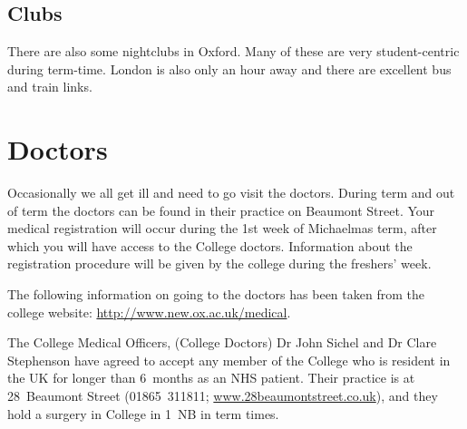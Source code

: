 \subsection{Clubs}
There are also some nightclubs in Oxford. Many of these are very student-centric during term-time. London is also only an hour away and there are excellent bus and train links.
\section{Doctors}
Occasionally we all get ill and need to go visit the doctors. During term and out of term the doctors can be found in their practice on Beaumont Street. Your medical registration will occur during the 1st week of Michaelmas term, after which you will have access to the College doctors. Information about the registration procedure will be given by the college during the freshers’ week. 

The following information on going to the doctors has been taken from the
college website: \mbox{\url{http://www.new.ox.ac.uk/medical}}.

The College Medical Officers, (College Doctors) Dr John Sichel and Dr Clare
Stephenson have agreed to accept any member of the College who is resident in
the UK for longer than 6~months as an NHS patient. Their practice is at 28~Beaumont Street (01865~311811; \url{www.28beaumontstreet.co.uk}), and they hold
a surgery in College in 1~NB in term times.


